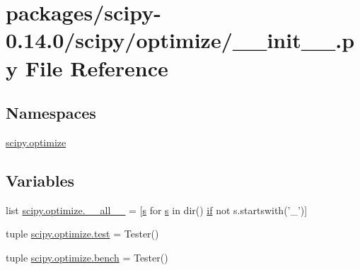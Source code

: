 \hypertarget{packages_2scipy-0_814_80_2scipy_2optimize_2____init_____8py}{}\section{packages/scipy-\/0.14.0/scipy/optimize/\+\_\+\+\_\+init\+\_\+\+\_\+.py File Reference}
\label{packages_2scipy-0_814_80_2scipy_2optimize_2____init_____8py}
\subsection*{Namespaces}
\begin{DoxyCompactItemize}
\item 
 \hyperlink{namespacescipy_1_1optimize}{scipy.\+optimize}
\end{DoxyCompactItemize}
\subsection*{Variables}
\begin{DoxyCompactItemize}
\item 
list \hyperlink{namespacescipy_1_1optimize_a28f76c1100840cd45451a3dccb385259}{scipy.\+optimize.\+\_\+\+\_\+all\+\_\+\+\_\+} = \mbox{[}\hyperlink{indexexpr_8h_ae024b0db549122b44c349ae28ec990dc}{s} for \hyperlink{indexexpr_8h_ae024b0db549122b44c349ae28ec990dc}{s} in dir() \hyperlink{minmax_8h_a30a0ee9fee303f01d9c5e6f669e0dfe9}{if} not s.\+startswith('\+\_\+')\mbox{]}
\item 
tuple \hyperlink{namespacescipy_1_1optimize_a521c732bf624dd18d5c8507070e1a463}{scipy.\+optimize.\+test} = Tester()
\item 
tuple \hyperlink{namespacescipy_1_1optimize_a39d7d2798240bd9e2b90df38c71a3fa1}{scipy.\+optimize.\+bench} = Tester()
\end{DoxyCompactItemize}
